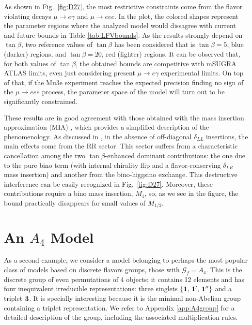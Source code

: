 \documentclass[a4paper,11pt]{article}
\begin{document}
As shown in Fig.~\ref{fig:D27}, the most restrictive constraints come from the flavor violating decays $\mu \to e \gamma$ and $\mu \to e e e$. In the plot, the colored shapes represent the parameter regions where the analyzed model would dissagree with current and future bounds in Table \ref{tab:LFVbounds}. As the results strongly depend on $\tan\beta$, two reference values of $\tan\beta$ has been considered that is $\tan\beta = 5$, blue (darker) regions, and $\tan\beta= 20$, red (lighter) regions. It can be observed that, for both values of $\tan\beta$, the obtained bounds are competitive with mSUGRA ATLAS limits, even just considering present $\mu \to e \gamma$ experimental limits. On top of that, if the Mu3e experiment reaches the expected precision finding no sign of the $\mu \to e e e$ process, the parameter space of the model will turn out to be significantly constrained.

These results are in good agreement with those obtained with the mass insertion approximation (MIA) \cite{Hall:1985dx,Gabbiani:1988rb,Gabbiani:1996hi,Paradisi:2005fk,Ciuchini:2007ha}, which provides a simplified description of the phenomenology. As discussed in \cite{Ciuchini:2007ha,Calibbi:2008qt,Calibbi:2009ja}, in the absence of off-diagonal $\delta_{LL}$ insertions, the main effects come from the RR sector. This sector suffers from a characteristic cancellation among the two $\tan\beta$-enhanced dominant contributions: the one due to the pure bino term (with internal chirality flip and a flavor-conserving $\delta_{LR}$ mass insertion) and another from the bino-higgsino exchange. This destructive interference can be easily recognized in Fig.~\ref{fig:D27}. Moreover, these contributions require a bino mass insertion, $M_1$, so, as we see in the figure, the bound practically disappears for small values of $M_{1/2}$.


\section{An $A_4$ Model}  
\label{sec:a4model}

As a second example, we consider a model belonging to perhaps the most popular class of models based on discrete flavors groups, those with $\mathcal{G}_f = A_4$. This is the discrete group of even permutations of 4 objects; it contains 12 elements and has four inequivalent irreducible representations: three singlets $\lbrace {\bf 1,\, 1',\, 1''}\rbrace$ and a triplet $\bf 3$. It is specially interesting because it is the minimal non-Abelian group containing a triplet representation. We refer to Appendix \ref{app:A4group} for a detailed description of the group, including the associated multiplication rules.
\end{document}
